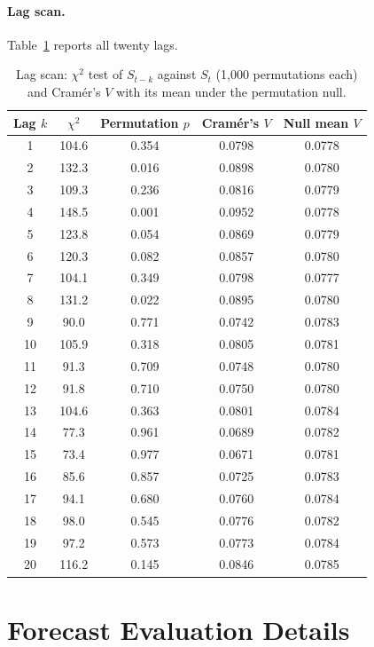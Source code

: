 \documentclass[11pt]{article}
\begin{document}
\paragraph{Lag scan.} Table~\ref{tab:lags} reports all twenty lags.

\begin{table}[htbp]\centering
\caption{Lag scan: $\chi^2$ test of $S_{t-k}$ against $S_t$ (1{,}000 permutations each) and Cram\'er's $V$ with its mean under the permutation null.}
\label{tab:lags}
\begin{tabular}{ccccc}
\toprule
Lag $k$ & $\chi^2$ & Permutation $p$ & Cram\'er's $V$ & Null mean $V$ \\
\midrule
1 & 104.6 & 0.354 & 0.0798 & 0.0778 \\
2 & 132.3 & 0.016 & 0.0898 & 0.0780 \\
3 & 109.3 & 0.236 & 0.0816 & 0.0779 \\
4 & 148.5 & 0.001 & 0.0952 & 0.0778 \\
5 & 123.8 & 0.054 & 0.0869 & 0.0779 \\
6 & 120.3 & 0.082 & 0.0857 & 0.0780 \\
7 & 104.1 & 0.349 & 0.0798 & 0.0777 \\
8 & 131.2 & 0.022 & 0.0895 & 0.0780 \\
9 & 90.0 & 0.771 & 0.0742 & 0.0783 \\
10 & 105.9 & 0.318 & 0.0805 & 0.0781 \\
11 & 91.3 & 0.709 & 0.0748 & 0.0780 \\
12 & 91.8 & 0.710 & 0.0750 & 0.0780 \\
13 & 104.6 & 0.363 & 0.0801 & 0.0784 \\
14 & 77.3 & 0.961 & 0.0689 & 0.0782 \\
15 & 73.4 & 0.977 & 0.0671 & 0.0781 \\
16 & 85.6 & 0.857 & 0.0725 & 0.0783 \\
17 & 94.1 & 0.680 & 0.0760 & 0.0784 \\
18 & 98.0 & 0.545 & 0.0776 & 0.0782 \\
19 & 97.2 & 0.573 & 0.0773 & 0.0784 \\
20 & 116.2 & 0.145 & 0.0846 & 0.0785 \\
\bottomrule
\end{tabular}
\end{table}

\clearpage
\section{Forecast Evaluation Details}
\label{app:oos}
\end{document}
